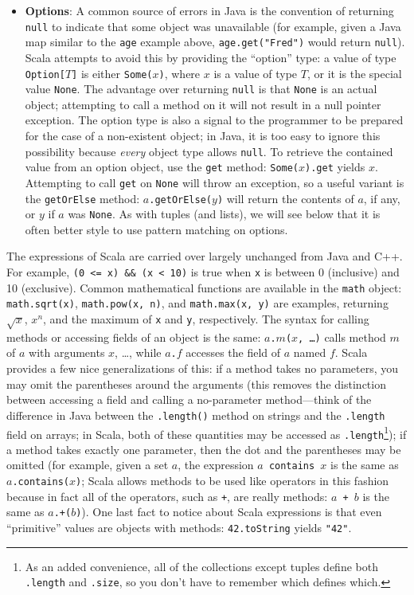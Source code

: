 \begin{itemize}
\item \textbf{Options}: A common source of errors in Java is the convention of returning \texttt{null} to indicate that some object was unavailable (for example, given a Java map similar to the \texttt{age} example above, \texttt{age.get("Fred")} would return \texttt{null}). Scala attempts to avoid this by providing the ``option'' type: a value of type \texttt{Option[$T$]} is either \texttt{Some($x$)}, where $x$ is a value of type $T$, or it is the special value \texttt{None}. The advantage over returning \texttt{null} is that \texttt{None} is an actual object; attempting to call a method on it will not result in a null pointer exception. The option type is also a signal to the programmer to be prepared for the case of a non-existent object; in Java, it is too easy to ignore this possibility because \emph{every} object type allows \texttt{null}. To retrieve the contained value from an option object, use the \texttt{get} method: \texttt{Some($x$).get} yields $x$. Attempting to call \texttt{get} on \texttt{None} will throw an exception, so a useful variant is the \texttt{getOrElse} method: \texttt{$a$.getOrElse($y$)} will return the contents of $a$, if any, or $y$ if $a$ was \texttt{None}. As with tuples (and lists), we will see below that it is often better style to use pattern matching on options.
\end{itemize}

The expressions of Scala are carried over largely unchanged from Java and C++. For example, \verb|(0 <= x) && (x < 10)| is true when \texttt{x} is between 0 (inclusive) and 10 (exclusive). Common mathematical functions are available in the \texttt{math} object: \texttt{math.sqrt(x)}, \texttt{math.pow(x, n)}, and \texttt{math.max(x, y)} are examples, returning $\sqrt{x}$, $x^n$, and the maximum of \texttt{x} and \texttt{y}, respectively. The syntax for calling methods or accessing fields of an object is the same: \texttt{$a$.$m$($x$, \ldots)} calls method $m$ of $a$ with arguments $x$, \ldots, while \texttt{$a$.$f$} accesses the field of $a$ named $f$. Scala provides a few nice generalizations of this: if a method takes no parameters, you may omit the parentheses around the arguments (this removes the distinction between accessing a field and calling a no-parameter method---think of the difference in Java between the \texttt{.length()} method on strings and the \texttt{.length} field on arrays; in Scala, both of these quantities may be accessed as \texttt{.length}\footnote{As an added convenience, all of the collections except tuples define both \texttt{.length} and \texttt{.size}, so you don't have to remember which defines which.}); if a method takes exactly one parameter, then the dot and the parentheses may be omitted (for example, given a set $a$, the expression \texttt{$a$ contains $x$} is the same as \texttt{$a$.contains($x$)}; Scala allows methods to be used like operators in this fashion because in fact all of the operators, such as \texttt{+}, are really methods: \texttt{$a$ + $b$} is the same as \texttt{$a$.+($b$)}). One last fact to notice about Scala expressions is that even ``primitive'' values are objects with methods: \texttt{42.toString} yields \texttt{"42"}.

